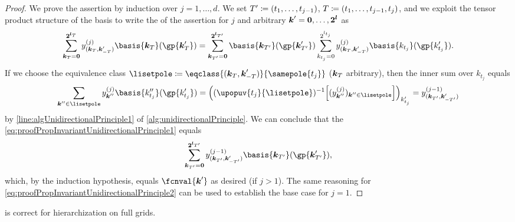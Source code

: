 \begin{proof}
  We prove the assertion by induction over $j = 1, \dotsc, d$.
  We set $T' \coloneqq (t_1, \dotsc, t_{j-1})$,
  $T \coloneqq (t_1, \dotsc, t_{j-1}, t_j)$,
  and we exploit the tensor product structure of the basis
  to write the \lhs of the assertion for $j$
  and arbitrary ${\boldsymbol{k}}' = {\boldsymbol{0}}, \dotsc, {\boldsymbol{2}}^{{\boldsymbol{l}}}$ as
  \begin{equation}
    \label{eq:proofPropInvariantUnidirectionalPrinciple1}
    \sum_{\*k_T=\*0}^{\*2^{\*l_T}}
    \linout[(j)]{(\*k_T,\*k'_{-T})} \basis{\*k_T}(\gp{\*k'_T})
    = \sum_{\*k_{T'}=\*0}^{\*2^{\*l_{T'}}}
    \basis{\*k_{T'}}(\gp{\*k'_{T'}})
    \sum_{k_{t_j}=0}^{2^{l_{t_j}}}
    \linout[(j)]{(\*k_T,\*k'_{-T})} \basis{k_{t_j}}(\gp{k'_{t_j}}).
  \end{equation}
  If we choose the equivalence class
  $\lisetpole \ceq \eqclass{(\*k_T,\*k'_{-T})}{\samepole{t_j}}$
  (${\boldsymbol{k}}_T$ arbitrary),
  then the inner sum over $k_{t_j}$ equals
  \begin{equation}
    \label{eq:proofPropInvariantUnidirectionalPrinciple2}
    \sum_{\*k'' \in \lisetpole}
    \linout[(j)]{\*k''} \basis{k''_{t_j}}(\gp{k'_{t_j}})
    = \paren*{
      (\upopuv{t_j}{\lisetpole})^{-1}
      \bracket*{(\linout[(j)]{\*k''})_{\*k'' \in \lisetpole}}
    }_{k'_{t_j}}
    = \linout[(j-1)]{(\*k_{T'},\*k'_{-T'})}
  \end{equation}
  by \cref{line:algUnidirectionalPrinciple1} of
  \cref{alg:unidirectionalPrinciple}.
  We can conclude that the \lhs
  \cref{eq:proofPropInvariantUnidirectionalPrinciple1} equals
  \begin{equation}
    \sum_{\*k_{T'}=\*0}^{\*2^{\*l_{T'}}}
    \linout[(j-1)]{(\*k_{T'},\*k'_{-T'})}
    \basis{\*k_{T'}}(\gp{\*k'_{T'}}),
  \end{equation}
  which, by the induction hypothesis, equals $\fcnval{\*k'}$ as desired
  (if $j > 1$).
  The same reasoning for
  \eqref{eq:proofPropInvariantUnidirectionalPrinciple2} can be used
  to establish the base case for $j = 1$.
\end{proof}

\begin{shortcorollary}
  \label{cor:algUnidirectionalPrincipleCorrectness}
  is correct for hierarchization on full grids.
\end{shortcorollary}

